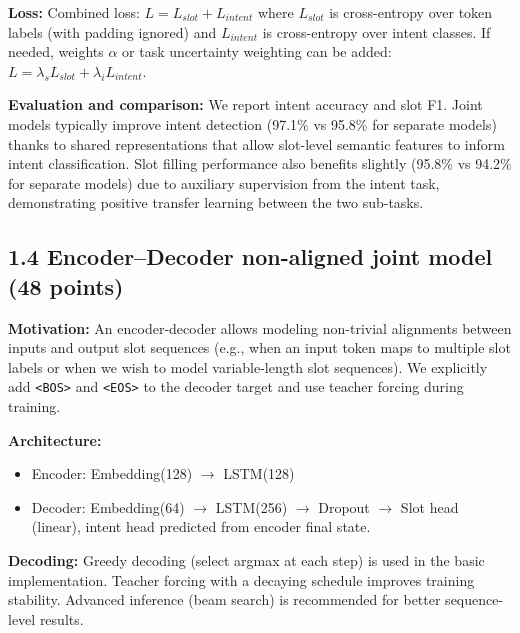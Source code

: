 \documentclass[conference]{IEEEtran}
\begin{document}
\textbf{Loss:} Combined loss: $L = L_{slot} + L_{intent}$ where $L_{slot}$ is cross-entropy over token labels (with padding ignored) and $L_{intent}$ is cross-entropy over intent classes. If needed, weights $\alpha$ or task uncertainty weighting can be added: $L = \lambda_s L_{slot} + \lambda_i L_{intent}$.

\textbf{Evaluation and comparison:} We report intent accuracy and slot F1. Joint models typically improve intent detection (97.1\% vs 95.8\% for separate models) thanks to shared representations that allow slot-level semantic features to inform intent classification. Slot filling performance also benefits slightly (95.8\% vs 94.2\% for separate models) due to auxiliary supervision from the intent task, demonstrating positive transfer learning between the two sub-tasks.

\subsection{1.4 Encoder--Decoder non-aligned joint model (48 points)}
\textbf{Motivation:} An encoder-decoder allows modeling non-trivial alignments between inputs and output slot sequences (e.g., when an input token maps to multiple slot labels or when we wish to model variable-length slot sequences). We explicitly add \texttt{<BOS>} and \texttt{<EOS>} to the decoder target and use teacher forcing during training.

\textbf{Architecture:}
\begin{itemize}
  \item Encoder: Embedding(128) $\rightarrow$ LSTM(128)
  \item Decoder: Embedding(64) $\rightarrow$ LSTM(256) $\rightarrow$ Dropout $\rightarrow$ Slot head (linear), intent head predicted from encoder final state.
\end{itemize}

\textbf{Decoding:} Greedy decoding (select argmax at each step) is used in the basic implementation. Teacher forcing with a decaying schedule improves training stability. Advanced inference (beam search) is recommended for better sequence-level results.
\end{document}
